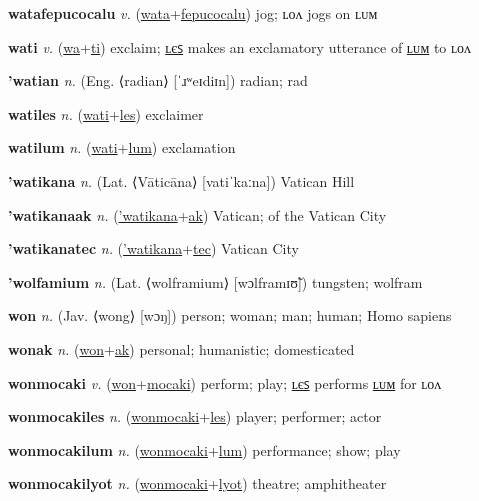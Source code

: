 \textbf{\hypertarget{watafepucocalu}{watafepucocalu}} \textit{v.} (\hyperlink{wata}{wata}+\allowbreak \hyperlink{fepucocalu}{fepucocalu})
jog; ʟᴏᴧ jogs on ʟᴜᴍ

\textbf{\hypertarget{wati}{wati}} \textit{v.} (\hyperlink{wa}{wa}+\allowbreak \hyperlink{ti}{ti})
exclaim; \hyperlink{watiles}{ʟєꜱ} makes an exclamatory utterance of \hyperlink{watilum}{ʟᴜᴍ} to ʟᴏᴧ

\textbf{\hypertarget{'watian}{'watian}} \textit{n.} (Eng. ⟨radian⟩ [ˈɹʷeɪdiɪn])
radian; rad

\textbf{\hypertarget{watiles}{watiles}} \textit{n.} (\hyperlink{wati}{wati}+\allowbreak \hyperlink{les}{les})
exclaimer

\textbf{\hypertarget{watilum}{watilum}} \textit{n.} (\hyperlink{wati}{wati}+\allowbreak \hyperlink{lum}{lum})
exclamation

\textbf{\hypertarget{'watikana}{'watikana}} \textit{n.} (Lat. ⟨Vāticāna⟩ [vatiˈkaːna])
Vatican Hill

\textbf{\hypertarget{'watikanaak}{'watikanaak}} \textit{n.} (\hyperlink{'watikana}{'watikana}+\allowbreak \hyperlink{ak}{ak})
Vatican; of the Vatican City

\textbf{\hypertarget{'watikanatec}{'watikanatec}} \textit{n.} (\hyperlink{'watikana}{'watikana}+\allowbreak \hyperlink{tec}{tec})
Vatican City

\textbf{\hypertarget{'wolfamium}{'wolfamium}} \textit{n.} (Lat. ⟨wolframium⟩ [wɔlframɪʊ̃])
tungsten; wolfram

\textbf{\hypertarget{won}{won}} \textit{n.} (Jav. ⟨wong⟩ [wɔŋ])
person; woman; man; human; Homo sapiens

\textbf{\hypertarget{wonak}{wonak}} \textit{n.} (\hyperlink{won}{won}+\allowbreak \hyperlink{ak}{ak})
personal; humanistic; domesticated

\textbf{\hypertarget{wonmocaki}{wonmocaki}} \textit{v.} (\hyperlink{won}{won}+\allowbreak \hyperlink{mocaki}{mocaki})
perform; play; \hyperlink{wonmocakiles}{ʟєꜱ} performs \hyperlink{wonmocakilum}{ʟᴜᴍ} for ʟᴏᴧ

\textbf{\hypertarget{wonmocakiles}{wonmocakiles}} \textit{n.} (\hyperlink{wonmocaki}{wonmocaki}+\allowbreak \hyperlink{les}{les})
player; performer; actor

\textbf{\hypertarget{wonmocakilum}{wonmocakilum}} \textit{n.} (\hyperlink{wonmocaki}{wonmocaki}+\allowbreak \hyperlink{lum}{lum})
performance; show; play

\textbf{\hypertarget{wonmocakilyot}{wonmocakilyot}} \textit{n.} (\hyperlink{wonmocaki}{wonmocaki}+\allowbreak \hyperlink{lyot}{lyot})
theatre; amphitheater

